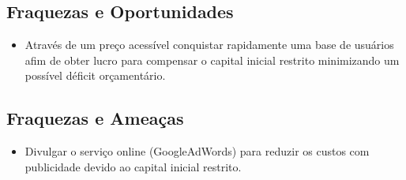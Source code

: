 \subsection{Fraquezas e Oportunidades}
\begin{itemize}
\item Através de um preço acessível conquistar rapidamente  uma base de usuários afim de obter lucro para compensar o capital inicial restrito minimizando um possível déficit orçamentário.
\end{itemize}
\subsection{Fraquezas e Ameaças}
\begin{itemize}
\item Divulgar o serviço online (GoogleAdWords) para reduzir os custos com publicidade devido ao capital inicial restrito.
\end{itemize}
